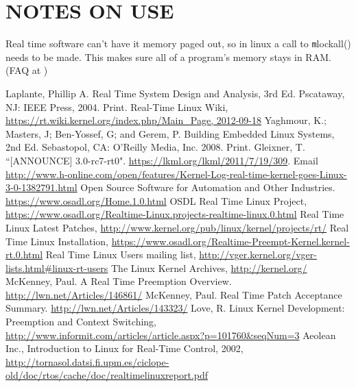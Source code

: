 \documentclass{article}
\begin{document}
\section{NOTES ON USE}
Real time software can't have it memory paged out, so in linux a call to {\texttt mlockall()} needs to be made.  This makes sure all of a program's memory stays in RAM. (FAQ at \cite{RealTimeLinux})

\begin{thebibliography}{9}

Laplante, Phillip A. Real Time System Design and Analysis, 3rd Ed. Pscataway, NJ: IEEE Press, 2004. Print.
Real-Time Linux Wiki, \url{https://rt.wiki.kernel.org/index.php/Main\_Page, 2012-09-18}
Yaghmour, K.; Masters, J; Ben-Yossef, G; and Gerem, P. Building Embedded Linux Systems, 2nd Ed. Sebastopol, CA: O'Reilly Media, Inc. 2008. Print.
Gleixner, T. ``[ANNOUNCE] 3.0-rc7-rt0". \url{https://lkml.org/lkml/2011/7/19/309}. Email
\url{http://www.h-online.com/open/features/Kernel-Log-real-time-kernel-goes-Linux-3-0-1382791.html}
Open Source Software for Automation and Other Industries. \url{https://www.osadl.org/Home.1.0.html}
OSDL Real Time Linux Project, \url{https://www.osadl.org/Realtime-Linux.projects-realtime-linux.0.html}
Real Time Linux Latest Patches, \url{http://www.kernel.org/pub/linux/kernel/projects/rt/}
Real Time Linux Installation, \url{https://www.osadl.org/Realtime-Preempt-Kernel.kernel-rt.0.html}
Real Time Linux Users mailing list, \url{http://vger.kernel.org/vger-lists.html#linux-rt-users}
The Linux Kernel Archives, \url{http://kernel.org/}
McKenney, Paul. A Real Time Preemption Overview. \url{http://lwn.net/Articles/146861/}
McKenney, Paul. Real Time Patch Acceptance Summary. \url{http://lwn.net/Articles/143323/}
Love, R. Linux Kernel Development: Preemption and Context Switching, \url{http://www.informit.com/articles/article.aspx?p=101760&seqNum=3}
Aeolean Inc., Introduction to Linux for Real-Time Control, 2002, \url{http://tornasol.datsi.fi.upm.es/ciclope-old/doc/rtos/cache/doc/realtimelinuxreport.pdf}
\end{thebibliography}
\end{document}
